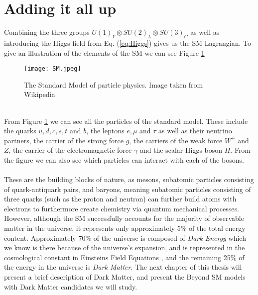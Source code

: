 \documentclass[12pt, a4paper]{book}
\begin{document}
\section{Adding it all up}
Combining the three groups $U(1)_Y\otimes SU(2)_L\otimes SU(3)_C$ as well as introducing the Higgs field from Eq. (\ref{eq:Higgs}) gives us the SM Lagrangian. 
To give an illustration of the elements of the SM we can see Figure \ref{fig:SM}
\begin{figure}[!ht]
    \centering
    \texttt{[image: SM.jpeg]}
    \caption[The Standard Model]{The Standard Model of particle physics. Image taken from Wikipedia \cite{sm_wikipedia}}\label{fig:SM}
\end{figure}
\\From Figure \ref{fig:SM} we can see all the particles of the standard model. These include the quarks $u,d,c,s,t$ and $b$, the leptons $e,\mu$ and $\tau$ as well as their neutrino partners, the carrier of the strong force $g$, the carriers of the weak force $W^\pm$ and $Z$, 
the carrier of the electromagnetic force $\gamma$ and the scalar Higgs boson $H$. From the figure we can also see which particles can interact with each of the bosons. \\
\\These are the building blocks of nature, as mesons, subatomic particles consisting of quark-antiquark pairs, and baryons, meaning subatomic particles consisting of three quarks (such as the proton and neutron) can further build atoms with electrons to furthermore create chemistry via 
quantum mechanical processes.
\newpage\noindent However, although the SM successfully accounts for the majority of observable matter in the universe, it represents only approximately 5\% of the total energy content. Approximately 70\% of the universe is composed of \textit{Dark Energy} which we know is there because of the universe's expansion, 
and is represented in the cosmological constant in Einsteins Field Equations \cite{Peebles:2002gy}, and the remaining 25\% of the energy in the universe is \textit{Dark Matter}. The next chapter of this thesis will present a brief description of Dark Matter, and present the Beyond SM models with Dark Matter candidates we will study.
\end{document}
